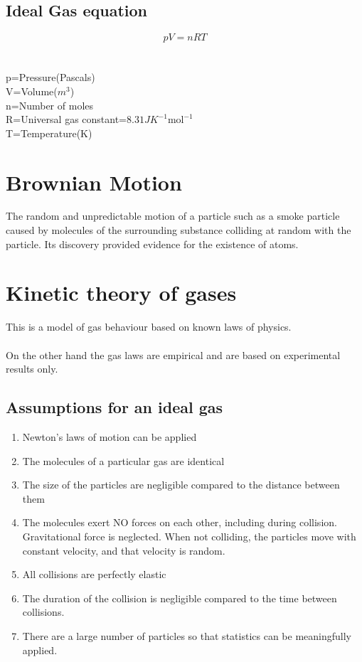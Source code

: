 \documentclass{article}[18pt]
\begin{document}
\subsection{Ideal Gas equation}
$$pV=nRT$$\\
\\
p=Pressure(Pascals)\\
V=Volume($m^3$)\\
n=Number of moles\\
R=Universal gas constant=$8.31JK^{-1}\text{mol}^{-1}$\\
T=Temperature(K)
\section{Brownian Motion}
The random and unpredictable motion of a particle such as a smoke particle caused by molecules of the surrounding substance colliding at random with the particle. Its discovery provided evidence for the existence of atoms.
\section{Kinetic theory of gases}
This is a model of gas behaviour based on known laws of physics.\\
\\
On the other hand the gas laws are empirical and are based on experimental results only.\\
\subsection{Assumptions for an ideal gas}
\begin{enumerate}
\item Newton's laws of motion can be applied
\item The molecules of a particular gas are identical
\item The size of the particles are negligible compared to the distance between them
\item The molecules exert NO forces on each other, including during collision. Gravitational force is neglected. When not colliding, the particles move with constant velocity, and that velocity is random.
\item All collisions are perfectly elastic
\item The duration of the collision is negligible compared to the time between collisions.
\item There are a large number of particles so that statistics can be meaningfully applied.
\end{enumerate}
\newpage
\end{document}
